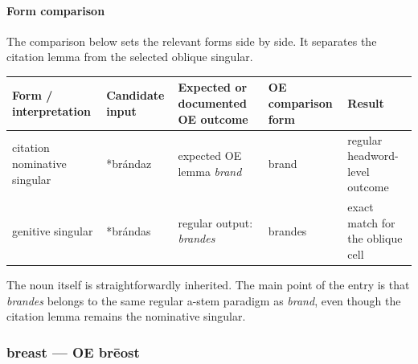 \documentclass[
  british,
  a4paper,
]{article}
\newcounter{none} %
\begin{document}
\paragraph{Form comparison}\label{form-comparison}

The comparison below sets the relevant forms side by side. It separates
the citation lemma from the selected oblique singular.

{\def\LTcaptype{none} %
\begin{longtable}[]{@{}
  >{\raggedright\arraybackslash}p{}
  >{\raggedright\arraybackslash}p{}
  >{\raggedright\arraybackslash}p{}
  >{\raggedright\arraybackslash}p{}
  >{\raggedright\arraybackslash}p{}@{}}
\toprule\noalign{}
\begin{minipage}[b]{\linewidth}\raggedright
Form / interpretation
\end{minipage} & \begin{minipage}[b]{\linewidth}\raggedright
Candidate input
\end{minipage} & \begin{minipage}[b]{\linewidth}\raggedright
Expected or documented OE outcome
\end{minipage} & \begin{minipage}[b]{\linewidth}\raggedright
OE comparison form
\end{minipage} & \begin{minipage}[b]{\linewidth}\raggedright
Result
\end{minipage} \\
\midrule\noalign{}
\endhead
\bottomrule\noalign{}
\endlastfoot
citation nominative singular & *brándaz & expected OE lemma \emph{brand}
& brand & regular headword-level outcome \\
genitive singular & *brándas & regular output: \emph{brandes} & brandes
& exact match for the oblique cell \\
\end{longtable}
}

The noun itself is straightforwardly inherited. The main point of the
entry is that \emph{brandes} belongs to the same regular a-stem paradigm
as \emph{brand}, even though the citation lemma remains the nominative
singular.

\subsubsection{breast --- OE brēost}\label{breast-oe-brux113ost}
\end{document}
